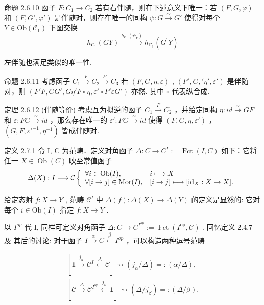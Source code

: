 \documentclass[]{article}
\begin{document}
命题 2.6.10 函子 $F: C_{1} \rightarrow C_{2}$ 若有右伴随，则在下述意义下唯一：若 $(F, G, \varphi)$ 和 $(F, G', \varphi')$ 是伴随对，则存在唯一的同构 $\psi: G \stackrel{\sim}{\rightarrow} G'$ 使得对每个 $Y \in \mathrm{Ob}(\mathcal{C}_{1})$ 下图交换 $$
h _ {\mathcal {C} _ {1}} (G Y) \xrightarrow {h _ {\mathcal {C} _ {1}} (\psi_ {Y})} h _ {\mathcal {C} _ {1}} (G ^ {\prime} Y)
$$

左伴随也满足类似的唯一性. 

命题 2.6.11 考虑函子 $C_{1} \xrightarrow{F} C_{2} \xrightarrow{F'} C_{3}$ 若 $(F, G, \eta, \varepsilon)$ , $(F', G, ' \eta', \varepsilon')$ 是伴随对，则 $(F' F, GG', G \eta' F \circ \eta, \varepsilon' \circ F' \varepsilon G')$ 亦然. 其中 $\circ$ 代表纵合成. 

定理 2.6.12 (伴随等价) 考虑互为拟逆的函子 $C_{1} \xrightarrow{F} C_{2}$ ，并给定同构 $\eta: id \xrightarrow{\sim} GF$ 和 $\varepsilon: FG \xrightarrow{\sim} id$ ，那么存在唯一的 $\varepsilon': FG \xrightarrow{\sim} id$ 使得 $(F, G, \eta, \varepsilon')$ ， $(G, F, \varepsilon'^{-1}, \eta^{-1})$ 皆成伴随对. 

定义 2.7.1 令 I, C 为范畴．定义对角函子 $\Delta: C \rightarrow C^{I} := \operatorname{Fct}(I, C)$ 如下：它将任一 $X \in \operatorname{Ob}(C)$ 映至常值函子 $$
\Delta (X): I \longrightarrow \mathcal {C} \left\{ \begin{array}{l l} \forall i \in \mathrm{Ob} (I), & i \longmapsto X \\ \forall [ i \to j ] \in \mathrm{Mor} (I), & [ i \to j ] \longmapsto [ \mathrm{id} _ {X}: X \to X ]. \end{array} \right.
$$

给定态射 $f: X \to Y$ , 范畴 $\mathcal{C}^I$ 中 $\Delta(f): \Delta(X) \to \Delta(Y)$ 的定义是显然的: 它对每个 $i \in \mathrm{Ob}(I)$ 指定 $f: X \to Y$ . 

以 $I^{op}$ 代 I, 同样可定义对角函子 $\Delta: C \rightarrow C^{I^{op}} := \operatorname{Fct}(I^{\operatorname{op}}, \mathcal{C})$ . 回忆定义 2.4.7 及 其后的讨论: 对于函子 $I \xrightarrow{\alpha} C \xleftarrow{\beta} I^{op}$ ，可以构造两种逗号范畴 

$$
\begin{array}{l} \left[ \mathbf {1} \xrightarrow {j _ {\alpha}} \mathcal {C} ^ {I} \xleftarrow {\Delta} \mathcal {C} \right]\rightsquigarrow (j _ {\alpha} / \Delta) =: (\alpha / \Delta), \\ \left[ \mathcal {C} \xrightarrow {\Delta} \mathcal {C} ^ {I ^ {\mathrm{op}}} \stackrel {j _ {\beta}} {\longleftarrow} \mathbf {1} \right]\rightsquigarrow (\Delta / j _ {\beta}) =: (\Delta / \beta). \\ \end{array}
$$
\end{document}
